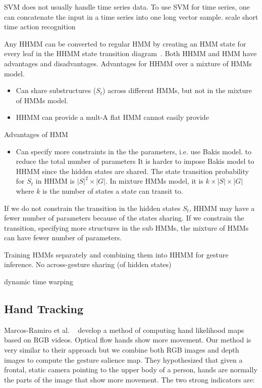 \documentclass{sigchi}
\begin{document}
SVM does not usually handle time series data. To use SVM for time series, one
can concatenate the input in a time series into one long vector sample. scale
short time
action recognition

Any HHMM can be converted to regular HMM by creating an HMM state for every leaf in the HHMM
state transition diagram~\cite{murphy02}. Both HHMM and HMM have advantages and disadvantages. Advantages for HHMM
over a mixture of HMMs model.
\begin{itemize}
  \item Can share substructures ($S_t$) across different HMMs, but not in the mixture of HMMs model.
  \item HHMM can provide a mult-A flat HMM cannot easily provide
\end{itemize}

Advantages of HMM
\begin{itemize}
  \item Can specify more constraints in the the parameters, i.e. use Bakis model. to reduce the total number of parameters
It is harder to impose Bakis model to HHMM since the hidden states are shared. The state transition probability for $S_t$ in HHMM
is $|S|^2 \times |G| $. In mixture HMMs model, it is $k\times |S|\times|G|$ where $k$ is the number of states a state can transit to.
\end{itemize}

If we do not constrain the transition in the hidden states $S_t$, HHMM may have a fewer number of parameters because of the states sharing.
If we constrain the transition, specifying more structures in the sub HMMs, the mixture of HMMs can have fewer number of parameters.

Training HMMs separately and combining them into HHMM for gesture inference. No across-gesture sharing (of hidden states)

dynamic time warping

\subsection{Hand Tracking}
Marcos-Ramiro et al. ~\cite{marcos2013} develop a method of computing hand likelihood maps based on RGB videos. Optical flow
hands show more movement. Our method is very similar to their approach but we combine both RGB images and depth images to compute
the gesture salience map. They hypothesized that given a frontal, static camera pointing to the upper body of a person, hands are
normally the parts of the image that show more movement. The two strong indicators are:
\end{document}

